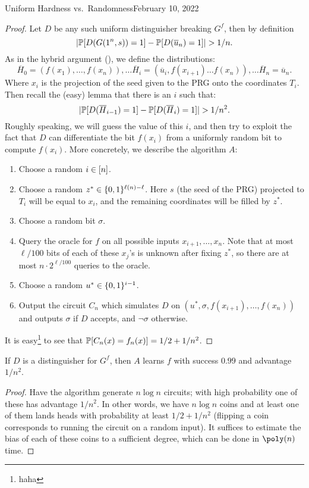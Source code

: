 \begin{lecture}{4}{Uniform Hardness vs.\ Randomness}{February 10, 2022}
\begin{proof}
	Let $D$ be any such uniform distinguisher breaking $G^f$, then by
	definition
	\[
		\lvert\mathbb{P}[D(G(1^n, s)) = 1] - \mathbb{P}[D(\overline{u}_n) = 1]\rvert >
		1 / n.
	\]
	As in the hybrid argument (), we define the
	distributions:
	\[
		\overline{H}_0 = (f(x_1), \ldots  ,f(x_n)), \ldots
		\overline{H}_i = (\overline{u}_i, f(x_{i + 1}) \ldots f(x_n)), \ldots
		\overline{H}_n = \overline{u}_n.
	\]
	Where $x_i$ is the projection of the seed given to the PRG onto the
	coordinates $T_i$.
	Then recall the (easy) lemma that there is an $i$ such that:
	\[
		\lvert\mathbb{P}[D(\overline{H}_{i - 1}) = 1]
		- \mathbb{P}[D(\overline{H}_i) = 1]\rvert > 1 / n^2.
	\]
	Roughly speaking, we will guess the value of this $i$, and then try to
	exploit the fact that $D$ can differentiate the bit $f(x_i)$ from a
	uniformly random bit to compute $f(x_i)$. More concretely, we describe
	the algorithm $A$:
	\begin{enumerate}
		\item Choose a random $i \in [n]$.
		\item Choose a random $z^* \in \{0, 1\}^{\ell(n) - \ell}$. Here $s$
			(the seed of the PRG) projected to $T_i$ will be equal to $x_i$,
			and the remaining coordinates will be filled by $z^*$.
		\item Choose a random bit $\sigma$.
		\item Query the oracle for $f$ on all possible inputs
			$x_{i + 1}, \ldots , x_n$. Note that at most $\ell / 100$ bits of
			each of these $x_j$'s is unknown after fixing $z^*$, so there
			are at most $n \cdot 2^{\ell / 100}$ queries to the oracle.
		\item Choose a random $u^* \in \{0, 1\}^{i - 1}$.
		\item Output the circuit $C_n$ which simulates $D$ on
			$(u^*, \sigma, f(x_{i + 1}), \ldots , f(x_n))$ and outputs
			$\sigma$ if $D$ accepts, and $\lnot \sigma$ otherwise.
	\end{enumerate}
	It is easy\footnote{haha} to see that
	$\mathbb{P}[C_n(x) = f_n(x)] = 1/2 + 1/n^2$.
\end{proof}

\begin{proposition}
	If $D$ is a distinguisher for $G^{f}$, then $A$ learns $f$ with success
	$0.99$ and advantage $1/n^2$.
\end{proposition}

\begin{proof}
  Have the algorithm generate $n \log{n}$ circuits; with high probability one
  of these has advantage $1/n^2$. In other words, we have $n \log{n}$ coins and
  at least one of them lands heads with probability at least $1/2 + 1/n^2$
  (flipping a coin corresponds to running the circuit on a random input). It
  suffices to estimate the bias of each of these coins to a sufficient degree,
  which can be done in $\poly(n)$ time.
\end{proof}


\end{lecture}
